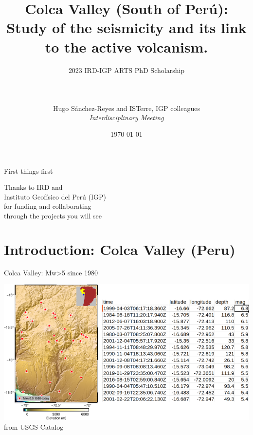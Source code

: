 \documentclass{beamer}
\title{{\normalsize \vskip 1.5cm Colca Valley (South of Perú): \\ Study of the seismicity and its link to the active volcanism.}}
\author{ {2023 IRD-IGP ARTS PhD Scholarship} \\
\\ 
\\
\\
\vfill
Hugo Sánchez-Reyes and ISTerre, IGP colleagues \\
\textit{Interdisciplinary Meeting}
}
\date[2022]{\today}
\begin{document}

\begin{frame}
    \titlepage
\end{frame}

\begin{frame}
 {First things first}
 
 \LARGE \centering
 Thanks to IRD and \\ Instituto Geofísico del Perú (IGP) \\
 for funding and collaborating \\
 through the projects you will see
 
\end{frame}


\section{Introduction: Colca Valley (Peru)}

\begin{frame}
 {Colca Valley: Mw>5 since 1980}

 \vskip 1cm
 \centering
 \includegraphics[width=1\linewidth]{images/Colca_1980} \\
 \hfill from USGS Catalog
  
\end{frame}
\end{document}
